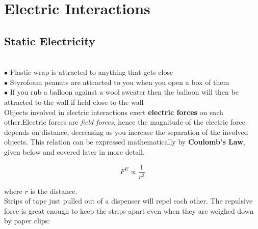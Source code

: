 \section{Electric Interactions}


    \subsection{Static Electricity}     %

         \\
        $\bullet$ Plastic wrap is attracted to anything that gets close \\
        $\bullet$ Styrofoam peanuts are attracted to you when you open a box of them \\
        $\bullet$ If you rub a balloon against a wool sweater then the balloon will then be attracted to the wall if held close to the wall \\

        Objects involved in electric interactions exert \textbf{electric forces} on each other.Electric forces are \textit{field forces}, hence the magnitude of the electric force depends on distance, decreasing as you
        increase the separation of the involved objects. This relation can be expressed mathematically by \textbf{Coulomb's Law}, given below and covered later in more detail.

        \[
            F^E \propto \frac{1}{r^2}
        \]

        where $r$ is the distance. \\

        Strips of tape just pulled out of a dispenser will repel each other. The repulsive force is great enough to keep the strips apart even when they are weighed down by paper clips:

